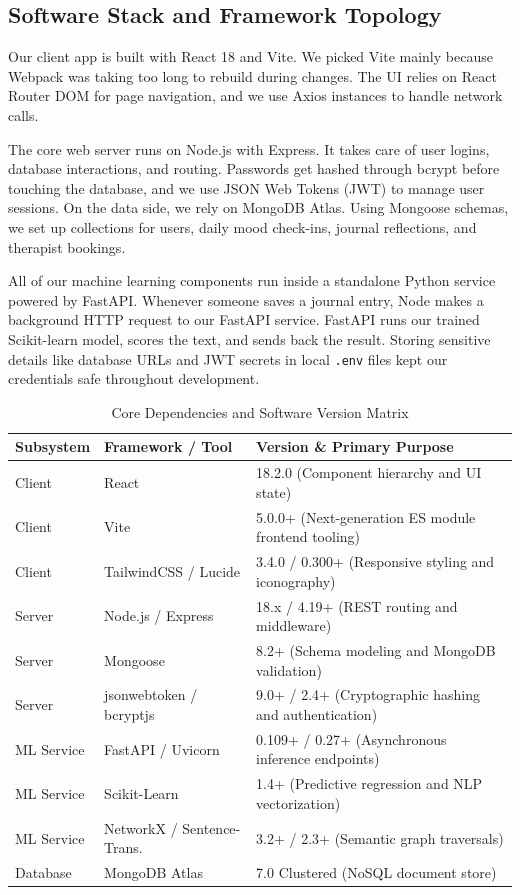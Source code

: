\documentclass[a4paper,11pt]{report}
\begin{document}
\subsection{Software Stack and Framework Topology}
Our client app is built with React 18 and Vite. We picked Vite mainly because Webpack was taking too long to rebuild during changes. The UI relies on React Router DOM for page navigation, and we use Axios instances to handle network calls.

The core web server runs on Node.js with Express. It takes care of user logins, database interactions, and routing. Passwords get hashed through bcrypt before touching the database, and we use JSON Web Tokens (JWT) to manage user sessions. On the data side, we rely on MongoDB Atlas. Using Mongoose schemas, we set up collections for users, daily mood check-ins, journal reflections, and therapist bookings.

All of our machine learning components run inside a standalone Python service powered by FastAPI. Whenever someone saves a journal entry, Node makes a background HTTP request to our FastAPI service. FastAPI runs our trained Scikit-learn model, scores the text, and sends back the result. Storing sensitive details like database URLs and JWT secrets in local \texttt{.env} files kept our credentials safe throughout development.

\begin{table}[H]
\centering
\caption{Core Dependencies and Software Version Matrix}
\label{tab:software_matrix}
\begin{tabular}{llp{7.5cm}}
\toprule
\textbf{Subsystem} & \textbf{Framework / Tool} & \textbf{Version \& Primary Purpose} \\
\midrule
Client & React & 18.2.0 (Component hierarchy and UI state) \\
Client & Vite & 5.0.0+ (Next-generation ES module frontend tooling) \\
Client & TailwindCSS / Lucide & 3.4.0 / 0.300+ (Responsive styling and iconography) \\
Server & Node.js / Express & 18.x / 4.19+ (REST routing and middleware) \\
Server & Mongoose & 8.2+ (Schema modeling and MongoDB validation) \\
Server & jsonwebtoken / bcryptjs & 9.0+ / 2.4+ (Cryptographic hashing and authentication) \\
ML Service & FastAPI / Uvicorn & 0.109+ / 0.27+ (Asynchronous inference endpoints) \\
ML Service & Scikit-Learn & 1.4+ (Predictive regression and NLP vectorization) \\
ML Service & NetworkX / Sentence-Trans. & 3.2+ / 2.3+ (Semantic graph traversals) \\
Database & MongoDB Atlas & 7.0 Clustered (NoSQL document store) \\
\bottomrule
\end{tabular}
\end{table}
\end{document}
